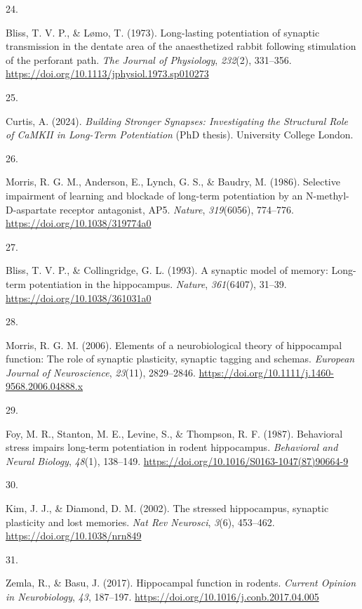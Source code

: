 \documentclass[
  11pt,
  letterpaper,
]{scrreprt}
\newlength{\cslhangindent}
\newlength{\csllabelwidth}
\newenvironment{CSLReferences}[2] %
 {\begin{list}{}{%
  \setlength{\itemindent}{0pt}
  \setlength{\leftmargin}{0pt}
  \setlength{\parsep}{0pt}
  \ifodd #1
   \setlength{\leftmargin}{\cslhangindent}
   \setlength{\itemindent}{-1\cslhangindent}
  \fi
  \setlength{\itemsep}{#2\baselineskip}}}
 {\end{list}}
\newcommand{\CSLLeftMargin}[1]{\parbox[t]{\csllabelwidth}{\strut#1\strut}}
\newcommand{\CSLRightInline}[1]{\parbox[t]{\linewidth - \csllabelwidth}{\strut#1\strut}}
\begin{document}
\begin{CSLReferences}{0}{0}
\CSLLeftMargin{24. }%
\CSLRightInline{Bliss, T. V. P., \& Lømo, T. (1973). Long-lasting
potentiation of synaptic transmission in the dentate area of the
anaesthetized rabbit following stimulation of the perforant path.
\emph{The Journal of Physiology}, \emph{232}(2), 331--356.
\url{https://doi.org/10.1113/jphysiol.1973.sp010273}}

\CSLLeftMargin{25. }%
\CSLRightInline{Curtis, A. (2024). \emph{Building {Stronger Synapses}:
{Investigating} the {Structural Role} of {CaMKII} in {Long-Term
Potentiation}} (PhD thesis). University College London.}

\CSLLeftMargin{26. }%
\CSLRightInline{Morris, R. G. M., Anderson, E., Lynch, G. S., \& Baudry,
M. (1986). Selective impairment of learning and blockade of long-term
potentiation by an {N-methyl-D-aspartate} receptor antagonist, {AP5}.
\emph{Nature}, \emph{319}(6056), 774--776.
\url{https://doi.org/10.1038/319774a0}}

\CSLLeftMargin{27. }%
\CSLRightInline{Bliss, T. V. P., \& Collingridge, G. L. (1993). A
synaptic model of memory: Long-term potentiation in the hippocampus.
\emph{Nature}, \emph{361}(6407), 31--39.
\url{https://doi.org/10.1038/361031a0}}

\CSLLeftMargin{28. }%
\CSLRightInline{Morris, R. G. M. (2006). Elements of a neurobiological
theory of hippocampal function: The role of synaptic plasticity,
synaptic tagging and schemas. \emph{European Journal of Neuroscience},
\emph{23}(11), 2829--2846.
\url{https://doi.org/10.1111/j.1460-9568.2006.04888.x}}

\CSLLeftMargin{29. }%
\CSLRightInline{Foy, M. R., Stanton, M. E., Levine, S., \& Thompson, R.
F. (1987). Behavioral stress impairs long-term potentiation in rodent
hippocampus. \emph{Behavioral and Neural Biology}, \emph{48}(1),
138--149. \url{https://doi.org/10.1016/S0163-1047(87)90664-9}}

\CSLLeftMargin{30. }%
\CSLRightInline{Kim, J. J., \& Diamond, D. M. (2002). The stressed
hippocampus, synaptic plasticity and lost memories. \emph{Nat Rev
Neurosci}, \emph{3}(6), 453--462. \url{https://doi.org/10.1038/nrn849}}

\CSLLeftMargin{31. }%
\CSLRightInline{Zemla, R., \& Basu, J. (2017). Hippocampal function in
rodents. \emph{Current Opinion in Neurobiology}, \emph{43}, 187--197.
\url{https://doi.org/10.1016/j.conb.2017.04.005}}


\end{CSLReferences}
\end{document}
